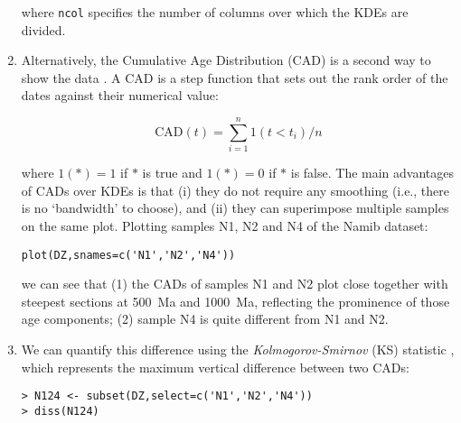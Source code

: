 \documentclass[11pt]{article}
\begin{document}
\begin{enumerate}
  where \texttt{ncol} specifies the number of columns over which the
  KDEs are divided.

\item Alternatively, the Cumulative Age Distribution (CAD) is a second
  way to show the data \citep{vermeesch2007a}. A CAD is a step
  function that sets out the rank order of the dates against their
  numerical value:

  \begin{equation}
    \mathrm{CAD}(t) = \sum_{i=1}^{n} 1(t<t_i)/n
    \label{eq:CAD}
  \end{equation}

  where $1(\ast) = 1$ if $\ast$ is true and $1(\ast) = 0$ if $\ast$ is
  false. The main advantages of CADs over KDEs is that (i) they do not
  require any smoothing (i.e., there is no `bandwidth' to choose), and
  (ii) they can superimpose multiple samples on the same plot.
  Plotting samples N1, N2 and N4 of the Namib dataset:

\begin{verbatim}
plot(DZ,snames=c('N1','N2','N4'))
\end{verbatim}

  we can see that (1) the CADs of samples N1 and N2 plot close
  together with steepest sections at 500~Ma and 1000~Ma, reflecting
  the prominence of those age components; (2) sample N4 is quite
  different from N1 and N2.

\item\label{it:KS} We can quantify this difference using the
  \emph{Kolmogorov-Smirnov} (KS) statistic \citep{feller1948,
    degraaff2003, vermeesch2018b}, which represents the maximum
  vertical difference between two CADs:

\begin{verbatim}
> N124 <- subset(DZ,select=c('N1','N2','N4'))
> diss(N124)
\end{verbatim}


\end{enumerate}
\end{document}
